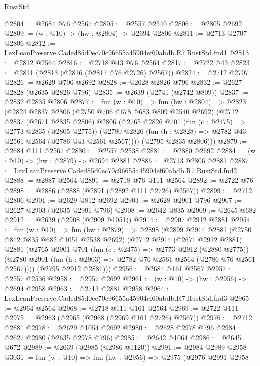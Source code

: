 \begin{lexlean}{RustStd}
\begin{coremodule}
@2804 := @2684 @76 @2567
@2805 := @2557 @2540
@2806 := @2805 @2692
@2809 := (w : @10) -> (hw : @2804) -> @2694 @2806
@2811 := @2713 @2707 @2806
@2812 := LexLeanPreserve.Caded85d0ec70c96655a45904ef60abdb.R7.RustStd.fnd1
@2813 := @2812 @2564
@2816 := @2718 @43 @76 @2564
@2817 := @2722 @43
@2823 := @2811 (@2813 (@2816 (@2817 @76 @2726) @2567))
@2824 := @2712 @2707
@2826 := @2629 @706 @2692
@2828 := @2628 @2826 @796
@2832 := @2627 @2828 (@2635 @2826 @796)
@2835 := @2639 (@2741 (@2742 @809))
@2837 := @2832 @2835 @2806
@2877 := fun (w : @10) =>
  fun (hw : @2804) =>
  @2823
    (@2824
      @2837
      @2806
      (@2750 @706 @678 @683 @809 @2540 @2692)
      (@2712
        @2837
        (@2671 @2835 @2806)
        @2806
        (@2765
          @2826
          @701
          (fun (c : @2475) => @2773 @2835 (@2805 @2775))
          (@2780 @2826 (fun (h : @2828) => @2782 @43 @2561 @2564 (@2786 @43 @2561 @2567))))
        (@2795 @2835 @2806)))
@2879 := @2684 @111 @2567
@2880 := @2557 @2538
@2881 := @2880 @2692
@2884 := (w : @10) -> (hw : @2879) -> @2694 @2881
@2886 := @2713 @2806 @2881
@2887 := LexLeanPreserve.Caded85d0ec70c96655a45904ef60abdb.R7.RustStd.fnd2
@2888 := @2887 @2564
@2891 := @2718 @76 @111 @2564
@2892 := @2722 @76
@2898 := @2886 (@2888 (@2891 (@2892 @111 @2726) @2567))
@2899 := @2712 @2806
@2901 := @2629 @812 @2692
@2903 := @2628 @2901 @796
@2907 := @2627 @2903 (@2635 @2901 @796)
@2908 := @2642 @835
@2909 := @2645 @682
@2912 := @2639 (@2908 (@2909 @1051))
@2914 := @2907 @2912 @2881
@2954 := fun (w : @10) =>
  fun (hw : @2879) =>
  @2898
    (@2899
      @2914
      @2881
      (@2750 @812 @835 @682 @1051 @2538 @2692)
      (@2712
        @2914
        (@2671 @2912 @2881)
        @2881
        (@2765
          @2901
          @701
          (fun (c : @2475) => @2773 @2912 (@2880 @2775))
          (@2780 @2901 (fun (h : @2903) => @2782 @76 @2561 @2564 (@2786 @76 @2561 @2567))))
        (@2795 @2912 @2881)))
@2956 := @2684 @161 @2567
@2957 := @2557 @2536
@2958 := @2957 @2692
@2961 := (w : @10) -> (hw : @2956) -> @2694 @2958
@2963 := @2713 @2881 @2958
@2964 := LexLeanPreserve.Caded85d0ec70c96655a45904ef60abdb.R7.RustStd.fnd3
@2965 := @2964 @2564
@2968 := @2718 @111 @161 @2564
@2969 := @2722 @111
@2975 := @2963 (@2965 (@2968 (@2969 @161 @2726) @2567))
@2976 := @2712 @2881
@2978 := @2629 @1054 @2692
@2980 := @2628 @2978 @796
@2984 := @2627 @2980 (@2635 @2978 @796)
@2985 := @2642 @1064
@2986 := @2645 @672
@2989 := @2639 (@2985 (@2986 @1120))
@2991 := @2984 @2989 @2958
@3031 := fun (w : @10) =>
  fun (hw : @2956) =>
  @2975
    (@2976
      @2991
      @2958

\end{coremodule}
\end{lexlean}
